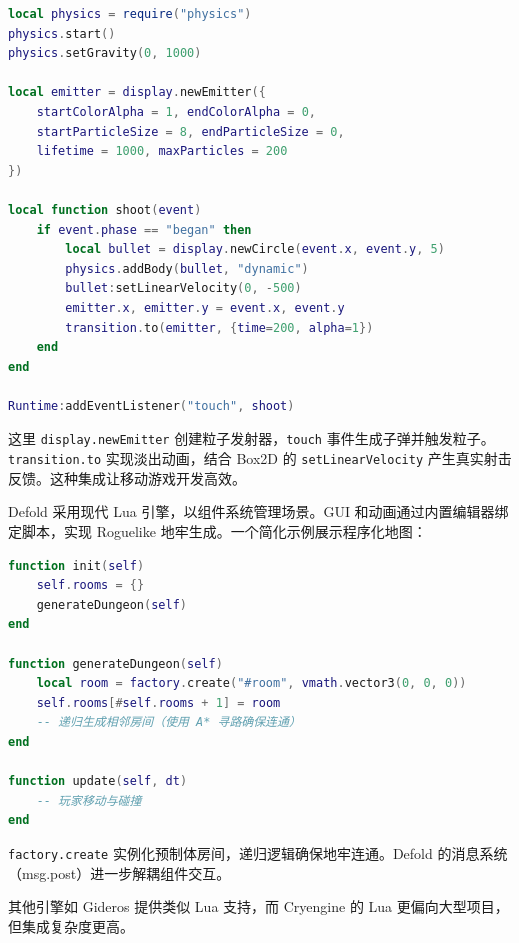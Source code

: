\begin{lstlisting}[language=lua]
local physics = require("physics")
physics.start()
physics.setGravity(0, 1000)

local emitter = display.newEmitter({
    startColorAlpha = 1, endColorAlpha = 0,
    startParticleSize = 8, endParticleSize = 0,
    lifetime = 1000, maxParticles = 200
})

local function shoot(event)
    if event.phase == "began" then
        local bullet = display.newCircle(event.x, event.y, 5)
        physics.addBody(bullet, "dynamic")
        bullet:setLinearVelocity(0, -500)
        emitter.x, emitter.y = event.x, event.y
        transition.to(emitter, {time=200, alpha=1})
    end
end

Runtime:addEventListener("touch", shoot)
\end{lstlisting}
这里 \texttt{display.newEmitter} 创建粒子发射器，\texttt{touch} 事件生成子弹并触发粒子。\texttt{transition.to} 实现淡出动画，结合 Box2D 的 \texttt{setLinearVelocity} 产生真实射击反馈。这种集成让移动游戏开发高效。\par
Defold 采用现代 Lua 引擎，以组件系统管理场景。GUI 和动画通过内置编辑器绑定脚本，实现 Roguelike 地牢生成。一个简化示例展示程序化地图：\par
\begin{lstlisting}[language=lua]
function init(self)
    self.rooms = {}
    generateDungeon(self)
end

function generateDungeon(self)
    local room = factory.create("#room", vmath.vector3(0, 0, 0))
    self.rooms[#self.rooms + 1] = room
    -- 递归生成相邻房间（使用 A* 寻路确保连通）
end

function update(self, dt)
    -- 玩家移动与碰撞
end
\end{lstlisting}
\texttt{factory.create} 实例化预制体房间，递归逻辑确保地牢连通。Defold 的消息系统（msg.post）进一步解耦组件交互。\par
其他引擎如 Gideros 提供类似 Lua 支持，而 Cryengine 的 Lua 更偏向大型项目，但集成复杂度更高。\par
